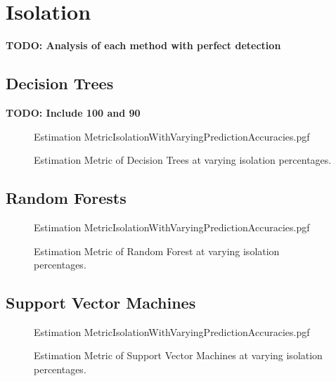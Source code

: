 \chapter{Isolation}
\label{chap:Isolation}

\textbf{TODO: Analysis of each method with perfect detection}

\section{Decision Trees}
\textbf{TODO: Include 100 and 90}
\begin{figure}[!htb]
	\centering
	{Estimation MetricIsolationWithVaryingPredictionAccuracies.pgf}
	
	\caption{Estimation Metric of Decision Trees at varying isolation percentages.}
	\label{fig:DecisionTreesWithVaryingPredictionEstimation}
\end{figure}

%	

\section{Random Forests}
\begin{figure}[!htb]
	\centering
	{Estimation MetricIsolationWithVaryingPredictionAccuracies.pgf}
	
	\caption{Estimation Metric of Random Forest at varying isolation percentages.}
	\label{fig:RandomForestWithVaryingPredictionEstimation}
\end{figure}

%	

\section{Support Vector Machines}
\begin{figure}[!htb]
	\centering
	{Estimation MetricIsolationWithVaryingPredictionAccuracies.pgf}
	
	\caption{Estimation Metric of Support Vector Machines at varying isolation percentages.}
	\label{fig:SVMWithVaryingPredictionEstimation}
\end{figure}

